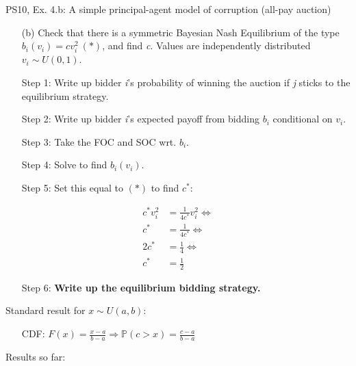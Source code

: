\begin{frame}{PS10, Ex. 4.b: A simple principal-agent model of corruption (all-pay auction)}
    \begin{itemize}
      \item[(b)] Check that there is a symmetric Bayesian Nash Equilibrium of the type $b_i(v_i) = cv_i^2\ (*)$, and find \textit{c}. Values are independently distributed $v_i\sim U(0, 1)$.
    \end{itemize} \vspace{-8pt}
    \begin{multicols}{2}
      \begin{itemize}
        \item[Step 1:] Write up bidder \textit{i}'s probability of winning the auction if \textit{j} sticks to the equilibrium strategy.
        \item[Step 2:] Write up bidder \textit{i}'s expected payoff from bidding $b_i$ conditional on $v_i$.
        \item[Step 3:] Take the FOC and SOC wrt. $b_i$.
        \item[Step 4:] Solve to find $b_i(v_i)$.
        \item[Step 5:] Set this equal to $(*)$ to find $c^*$:
      \end{itemize} \vspace{-6pt}
      \begin{align*}
        c^*v_i^2&=\frac{1}{4c^*}v_i^2\Leftrightarrow\\
        c^*&=\frac{1}{4c^*}\Leftrightarrow\\
        2c^*&=\frac{1}{4}\Leftrightarrow\\
        c^*&=\frac{1}{2}
      \end{align*} \vspace{-12pt}
      \begin{itemize}
        \item[Step 6:] \textbf{Write up the equilibrium bidding strategy.}
      \end{itemize}
      \vfill\null\columnbreak
      Standard result for $x\sim U(a, b):$ \vspace{-6pt}
      \begin{itemize}
        \item[CDF:] $F(x)=\frac{x-a}{b-a}\Rightarrow\mathbb{P}(c>x)=\frac{c-a}{b-a}$
      \end{itemize}
      \vspace{-6pt}
      Results so far: \vspace{-6pt}
      \begin{align*}

\end{align*}
\end{multicols}
\end{frame}
